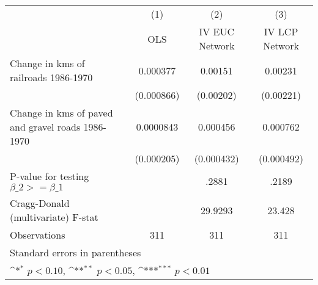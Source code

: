 {
\def\sym#1{\ifmmode^{#1}\else\(^{#1}\)\fi}
\begin{tabular}{l*{3}{c}}
\hline\hline
                &\multicolumn{1}{c}{(1)}&\multicolumn{1}{c}{(2)}&\multicolumn{1}{c}{(3)}\\
                &\multicolumn{1}{c}{OLS}&\multicolumn{1}{c}{IV EUC Network}&\multicolumn{1}{c}{IV LCP Network}\\
\hline
Change in kms of railroads 1986-1970& 0.000377         &  0.00151         &  0.00231         \\
                &(0.000866)         &(0.00202)         &(0.00221)         \\
[1em]
Change in kms of paved and gravel roads 1986-1970&0.0000843         & 0.000456         & 0.000762         \\
                &(0.000205)         &(0.000432)         &(0.000492)         \\
\hline
P-value for testing $\beta\_{2} >= \beta\_{1}$&                  &    .2881         &    .2189         \\
Cragg-Donald (multivariate) F-stat&                  &  29.9293         &   23.428         \\
Observations    &      311         &      311         &      311         \\
\hline\hline
\multicolumn{4}{l}{\footnotesize Standard errors in parentheses}\\
\multicolumn{4}{l}{\footnotesize \sym{*} \(p<0.10\), \sym{**} \(p<0.05\), \sym{***} \(p<0.01\)}\\
\end{tabular}
}
